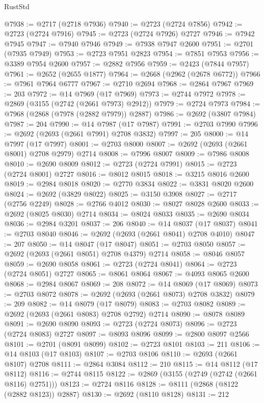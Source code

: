 \begin{lexlean}{RustStd}
\begin{coremodule}
@7938 := @2717 (@2718 @7936)
@7940 := @2723 (@2724 @7856)
@7942 := @2723 (@2724 @7916)
@7945 := @2723 (@2724 @7926) @2727
@7946 := @7942 @7945
@7947 := @7940 @7946
@7949 := @7938 @7947 @2600
@7951 := @2701 (@7935 @7949)
@7953 := @2723 @7951 @2823
@7954 := @7851 @7953
@7956 := @3389 @7954 @2600
@7957 := @2882 @7956
@7959 := @2423 (@7844 @7957)
@7961 := @2652 (@2655 @1877)
@7964 := @2668 (@2962 (@2678 @6772))
@7966 := @7961 @7964 @6777
@7967 := @2710 @2694
@7968 := @2864 @7967
@7969 := 203
@7972 := @14 @7969 (@17 @7969)
@7973 := @2744 @7972
@7978 := @2869 (@3155 (@2742 (@2661 @7973) @2912))
@7979 := @2724 @7973
@7984 := @7968 (@2868 (@7978 (@2882 @7979)) @2887)
@7986 := @2692 (@3807 @7984)
@7987 := 204
@7990 := @14 @7987 (@17 @7987)
@7991 := @2703 @7990
@7996 := @2692 (@2693 (@2661 @7991) @2708 @3832)
@7997 := 205
@8000 := @14 @7997 (@17 @7997)
@8001 := @2703 @8000
@8007 := @2692 (@2693 (@2661 @8001) @2708 @2979) @2714
@8008 := @7996 @8007
@8009 := @7986 @8008
@8010 := @2690 @8009
@8012 := @2723 (@2724 @7991)
@8015 := @2723 (@2724 @8001) @2727
@8016 := @8012 @8015
@8018 := @3215 @8016 @2600
@8019 := @2984 @8018
@8020 := @2770 @3834
@8022 := @3831 @8020 @2600
@8024 := @2692 (@3829 @8022)
@8025 := @3150 @3908
@8027 := @2717 (@2756 @2249)
@8028 := @2766 @4012
@8030 := @8027 @8028 @2600
@8033 := @2692 (@8025 @8030) @2714
@8034 := @8024 @8033
@8035 := @2690 @8034
@8036 := @2984 @3201
@8037 := 206
@8040 := @14 @8037 (@17 @8037)
@8041 := @2703 @8040
@8046 := @2692 (@2693 (@2661 @8041) @2708 @4010)
@8047 := 207
@8050 := @14 @8047 (@17 @8047)
@8051 := @2703 @8050
@8057 := @2692 (@2693 (@2661 @8051) @2708 @4379) @2714
@8058 := @8046 @8057
@8059 := @2690 @8058
@8061 := @2723 (@2724 @8041)
@8064 := @2723 (@2724 @8051) @2727
@8065 := @8061 @8064
@8067 := @4093 @8065 @2600
@8068 := @2984 @8067
@8069 := 208
@8072 := @14 @8069 (@17 @8069)
@8073 := @2703 @8072
@8078 := @2692 (@2693 (@2661 @8073) @2708 @3832)
@8079 := 209
@8082 := @14 @8079 (@17 @8079)
@8083 := @2703 @8082
@8089 := @2692 (@2693 (@2661 @8083) @2708 @2792) @2714
@8090 := @8078 @8089
@8091 := @2690 @8090
@8093 := @2723 (@2724 @8073)
@8096 := @2723 (@2724 @8083) @2727
@8097 := @8093 @8096
@8099 := @2800 @8097 @2566
@8101 := @2701 (@8091 @8099)
@8102 := @2723 @8101
@8103 := 211
@8106 := @14 @8103 (@17 @8103)
@8107 := @2703 @8106
@8110 := @2693 (@2661 @8107) @2708
@8111 := @2864 @3084
@8112 := 210
@8115 := @14 @8112 (@17 @8112)
@8116 := @2744 @8115
@8122 := @2869 (@3155 (@2749 (@2742 (@2661 @8116) @2751)))
@8123 := @2724 @8116
@8128 := @8111 (@2868 (@8122 (@2882 @8123)) @2887)
@8130 := @2692 (@8110 @8128)
@8131 := 212

\end{coremodule}
\end{lexlean}
